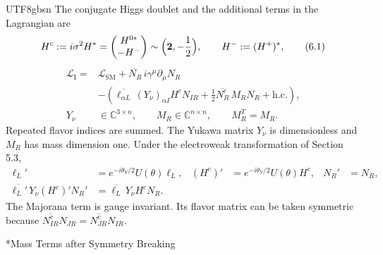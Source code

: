 \documentclass[11pt,a4paper,oneside]{report}
\makeatletter
\newcommand\topic{\@startsection{paragraph}{4}{\z@}{-1.7ex plus -.3ex}{.5ex}{\normalfont\normalsize\bfseries\itshape\boldmath}*}
\makeatother
\begin{document}
\begin{CJK*}{UTF8}{gbsn}
The conjugate Higgs doublet and the additional terms in the Lagrangian are
\begin{equation*}
H^c:=i\sigma^2H^*
=\begin{pmatrix}H^{0*}\\-H^-\end{pmatrix}
\sim\Bigl(\mathbf2,-\frac12\Bigr),\qquad H^-:=(H^+)^*,
\tag{6.1}\label{eq:6.1}
\end{equation*}
\begin{equation*}
{\displaystyle 
\begin{aligned}
\mathcal L_{\mathrm I}
={}&\mathcal L_{\mathrm{SM}}
+\overline{N_R}\,i\gamma^\mu\partial_\mu N_R\\
&-\left(\overline{\ell_{\alpha L}}\,(Y_\nu)_{\alpha I}H^cN_{IR}
+\frac12\overline{N_R^c}\,M_RN_R+\mathrm{h.c.}\right),\\
Y_\nu&\in\mathbb C^{3\times n},\qquad M_R\in\mathbb C^{n\times n},\qquad M_R^T=M_R.
\end{aligned}
}
\tag{6.2}\label{eq:6.2}
\end{equation*}
Repeated flavor indices are summed. The Yukawa matrix $Y_\nu$ is dimensionless and $M_R$ has mass dimension one. Under the electroweak transformation of Section 5.3,
\begin{equation*}
\begin{aligned}
\ell_L'&=e^{-i\theta_Y/2}U(\theta)\ell_L,
& (H^c)'&=e^{-i\theta_Y/2}U(\theta)H^c,
& N_R'&=N_R,\\
\overline{\ell_L'}\,Y_\nu(H^c)'N_R'
&=\overline{\ell_L}\,Y_\nu H^cN_R.
\end{aligned}
\tag{6.3}\label{eq:6.3}
\end{equation*}
The Majorana term is gauge invariant. Its flavor matrix can be taken symmetric because $\overline{N_{IR}^c}N_{JR}=\overline{N_{JR}^c}N_{IR}$.

\topic{Mass Terms after Symmetry Breaking}


\end{CJK*}
\end{document}
